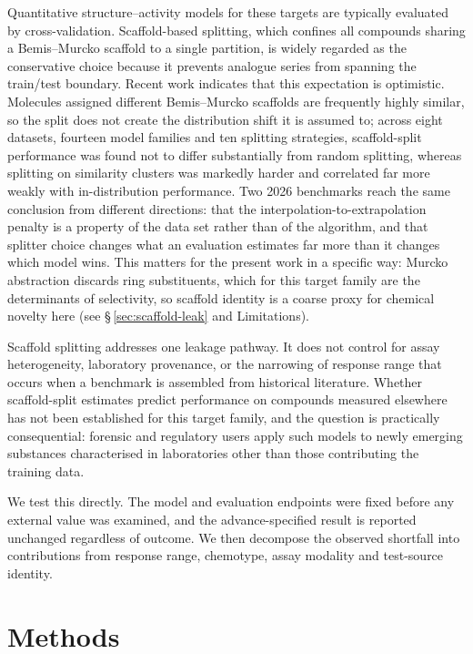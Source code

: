 \documentclass[11pt,a4paper]{article}
\begin{document}
Quantitative structure--activity models for these targets are typically evaluated by
cross-validation. Scaffold-based splitting, which confines all compounds sharing a
Bemis--Murcko scaffold \cite{Bemis1996} to a single partition, is widely regarded as the
conservative choice because it prevents analogue series from spanning the train/test
boundary.\cite{Sheridan2013,Lenselink2017} Recent work indicates that this expectation is
optimistic. Molecules assigned different Bemis--Murcko scaffolds are frequently
highly similar, so the split does not create the distribution shift it is assumed
to;\cite{Guo2024,Guo2025} across eight datasets, fourteen model families and ten
splitting strategies, scaffold-split performance was found not to differ
substantially from random splitting, whereas splitting on similarity clusters was
markedly harder and correlated far more weakly with in-distribution
performance.\cite{Fooladi2025} Two 2026 benchmarks reach the same conclusion from different directions: that the
interpolation-to-extrapolation penalty is a property of the data set rather than of
the algorithm,\cite{Alshehade2026} and that splitter choice changes what an
evaluation estimates far more than it changes which model wins.\cite{Crucitti2026}
This matters for the present work in a specific way:
Murcko abstraction discards ring substituents, which for this target family are the
determinants of selectivity, so scaffold identity is a coarse proxy for chemical
novelty here (see \S\,\ref{sec:scaffold-leak} and Limitations).

Scaffold splitting addresses one leakage pathway. It does not control for assay
heterogeneity, laboratory provenance, or the narrowing of response range that occurs
when a benchmark is assembled from historical literature.\cite{Landrum2023,Mayr2018} Whether scaffold-split
estimates predict performance on compounds measured elsewhere has not been established
for this target family, and the question is practically consequential: forensic and
regulatory users apply such models to newly emerging substances characterised in
laboratories other than those contributing the training data.

We test this directly. The model and evaluation endpoints were fixed before any
external value was examined, and the advance-specified result is reported unchanged
regardless of outcome. We then decompose the observed shortfall into contributions from
response range, chemotype, assay modality and test-source identity.

\section{Methods}
\label{sec:methods}
\end{document}
